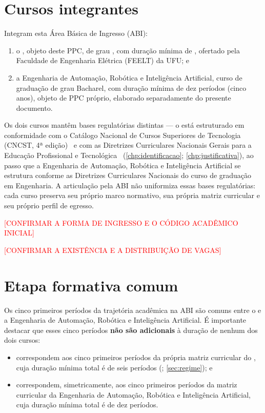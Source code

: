 \section{Cursos integrantes}

Integram esta Área Básica de Ingresso (ABI):

\begin{enumerate}
    \item o \ppccurso, objeto deste PPC, de grau \ppcgrau, com duração mínima de \ppctempominimo, ofertado pela Faculdade de Engenharia Elétrica (FEELT) da UFU; e
    \item a Engenharia de Automação, Robótica e Inteligência Artificial, curso de graduação de grau Bacharel, com duração mínima de dez períodos (cinco anos), objeto de PPC próprio, elaborado separadamente do presente documento.
\end{enumerate}

Os dois cursos mantêm bases regulatórias distintas — o \ppccurso está estruturado em conformidade com o Catálogo Nacional de Cursos Superiores de Tecnologia (CNCST, 4ª edição)~\cite{mec_cncst_2024} e com as Diretrizes Curriculares Nacionais Gerais para a Educação Profissional e Tecnológica~\cite{cne_cp_1_2021} (\autoref{chp:identificacao}; \autoref{chp:justificativa}), ao passo que a Engenharia de Automação, Robótica e Inteligência Artificial se estrutura conforme as Diretrizes Curriculares Nacionais do curso de graduação em Engenharia. A articulação pela ABI não uniformiza essas bases regulatórias: cada curso preserva seu próprio marco normativo, sua própria matriz curricular e seu próprio perfil de egresso.

\textcolor{red}{[CONFIRMAR A FORMA DE INGRESSO E O CÓDIGO ACADÊMICO INICIAL]}

\textcolor{red}{[CONFIRMAR A EXISTÊNCIA E A DISTRIBUIÇÃO DE VAGAS]}

\section{Etapa formativa comum}
\label{sec:etapa_comum}

Os cinco primeiros períodos da trajetória acadêmica na ABI são comuns entre o \ppccurso e a Engenharia de Automação, Robótica e Inteligência Artificial. É importante destacar que esses cinco períodos \textbf{não são adicionais} à duração de nenhum dos dois cursos:

\begin{itemize}
    \item correspondem aos cinco primeiros períodos da própria matriz curricular do \ppccurso, cuja duração mínima total é de seis períodos (\ppctempominimo; \autoref{sec:regime}); e
    \item correspondem, simetricamente, aos cinco primeiros períodos da matriz curricular da Engenharia de Automação, Robótica e Inteligência Artificial, cuja duração mínima total é de dez períodos.
\end{itemize}

